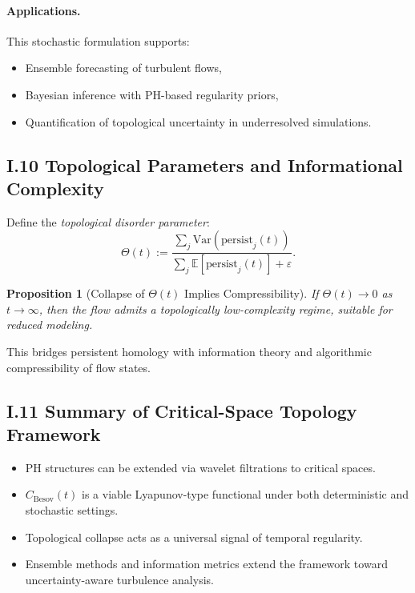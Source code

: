 \documentclass[11pt]{article}
\newtheorem{proposition}[theorem]{Proposition}
\theoremstyle{definition}
\begin{document}
\paragraph{Applications.} This stochastic formulation supports:
\begin{itemize}
  \item Ensemble forecasting of turbulent flows,
  \item Bayesian inference with PH-based regularity priors,
  \item Quantification of topological uncertainty in underresolved simulations.
\end{itemize}

\subsection*{I.10 Topological Parameters and Informational Complexity}

Define the \emph{topological disorder parameter}:
\[ \Theta(t) := \frac{\sum_j \mathrm{Var}(\mathrm{persist}_j(t))}{\sum_j \mathbb{E}[\mathrm{persist}_j(t)] + \varepsilon}. \]

\begin{proposition}[Collapse of $\Theta(t)$ Implies Compressibility]
If $\Theta(t) \to 0$ as $t \to \infty$, then the flow admits a topologically low-complexity regime, suitable for reduced modeling.
\end{proposition}

This bridges persistent homology with information theory and algorithmic compressibility of flow states.

\subsection*{I.11 Summary of Critical-Space Topology Framework}

\begin{itemize}
  \item PH structures can be extended via wavelet filtrations to critical spaces.
  \item $C_{\text{Besov}}(t)$ is a viable Lyapunov-type functional under both deterministic and stochastic settings.
  \item Topological collapse acts as a universal signal of temporal regularity.
  \item Ensemble methods and information metrics extend the framework toward uncertainty-aware turbulence analysis.
\end{itemize}
\end{document}
